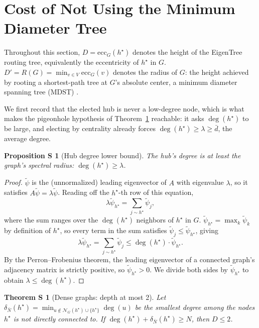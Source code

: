 \documentclass[letterpaper]{article} %
\newtheorem{sproposition}{Proposition S}
\newtheorem{stheorem}{Theorem S}
\begin{document}
\section{Cost of Not Using the Minimum Diameter Tree}
\label{sec:mdst-gap}

Throughout this section, $D = \mathrm{ecc}_G(h^\star)$ denotes the height
of the EigenTree routing tree, equivalently the eccentricity of $h^\star$ in
$G$. $D' = R(G) = \min_{v\in V}\mathrm{ecc}_G(v)$ denotes the radius of
$G$: the height achieved by rooting a shortest-path tree at $G$'s absolute
center, a minimum diameter spanning tree (MDST) \citep{hakimi1964,hassintamir1995}.

We first record that the elected hub is never a low-degree node, which is what
makes the pigeonhole hypothesis of Theorem~\ref{thm:mdst-gap} reachable: it
asks $\deg(h^\star)$ to be large, and electing by centrality already forces
$\deg(h^\star)\geq\lambda\geq\bar d$, the average degree.

\begin{sproposition}[Hub degree lower bound]
\label{prop:hubdeg}
The hub's degree is at least the graph's spectral radius: $\deg(h^\star) \geq \lambda$.
\end{sproposition}

\begin{proof}
$\tilde\psi$ is the (unnormalized) leading eigenvector of $A$ with
eigenvalue $\lambda$, so it satisfies $A\tilde\psi = \lambda\tilde\psi$.
Reading off the $h^\star$-th row of this equation,
\[
\lambda\tilde\psi_{h^\star} = \sum_{j \sim h^\star} \tilde\psi_j,
\]
where the sum ranges over the $\deg(h^\star)$ neighbors of $h^\star$ in
$G$. $\tilde\psi_{h^\star} = \max_k \tilde\psi_k$ by definition of
$h^\star$, so every term in the sum satisfies $\tilde\psi_j \leq
\tilde\psi_{h^\star}$, giving
\[
\lambda\tilde\psi_{h^\star} = \sum_{j\sim h^\star}\tilde\psi_j \leq \deg(h^\star)\cdot\tilde\psi_{h^\star}.
\]
By the Perron--Frobenius theorem, the leading eigenvector of a connected
graph's adjacency matrix is strictly positive, so $\tilde\psi_{h^\star} >
0$. We divide both sides by $\tilde\psi_{h^\star}$ to obtain $\lambda \leq
\deg(h^\star)$.
\end{proof}

\begin{stheorem}[Dense graphs: depth at most 2]
\label{thm:mdst-gap}
Let $\delta_{\bar N}(h^\star) = \min_{u \notin \mathcal{N}_G(h^\star)\cup\{h^\star\}} \deg(u)$ be the smallest degree among the nodes $h^\star$ is not directly connected to. If $\deg(h^\star) + \delta_{\bar N}(h^\star) \geq N$, then $D \leq 2$.
\end{stheorem}
\end{document}
